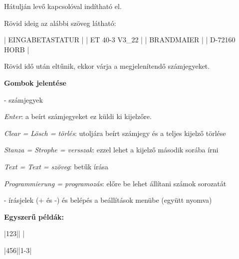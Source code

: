 \documentclass{article}
\begin{document}
Hátulján levő kapcsolóval indítható el.



Rövid ideig az alábbi szöveg látható:

|  EINGABETASTATUR   |
|  ET 40-3  V3_22    |
|    BRANDMAIER      |
|   D-72160 HORB     |

Rövid idő után eltűnik, ekkor várja a megjelenítendő számjegyeket.

\textbf{Gombok jelentése}

- számjegyek

\keys{ } \emph{Enter}: a beírt számjegyeket ez küldi ki kijelzőre.

 \emph{Clear = Lösch = törlés}: utoljára beírt számjegy és a teljes kijelző törlése

 \emph{Stanza = Strophe = versszak}: ezzel lehet a kijelző második sorába írni

 \emph{Text = Text = szöveg}: betűk írása

 \emph{Programmierung = programozás}: előre be lehet állítani számok sorozatát

\keys{{+}}-\keys{{-}} írásjelek (+ és -) és belépés a beállítások menübe (együtt nyomva)

\textbf{Egyszerű példák:}

   \keys{ } \hfill {}|123||   |

     \keys{-}  \keys{ } \hfill {}|456||1-3|
\end{document}

